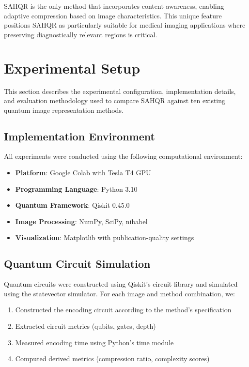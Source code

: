 \documentclass[pdflatex,sn-mathphys-num,Numbered]{sn-jnl}
\theoremstyle{thmstyleone}
\theoremstyle{thmstyletwo}
\theoremstyle{thmstylethree}
\begin{document}
SAHQR is the only method that incorporates content-awareness, enabling adaptive compression based on image characteristics. This unique feature positions SAHQR as particularly suitable for medical imaging applications where preserving diagnostically relevant regions is critical.

\section{Experimental Setup}\label{sec:experiments}

This section describes the experimental configuration, implementation details, and evaluation methodology used to compare SAHQR against ten existing quantum image representation methods.

\subsection{Implementation Environment}

All experiments were conducted using the following computational environment:

\begin{itemize}
\item \textbf{Platform}: Google Colab with Tesla T4 GPU
\item \textbf{Programming Language}: Python 3.10
\item \textbf{Quantum Framework}: Qiskit 0.45.0 \cite{bib70}
\item \textbf{Image Processing}: NumPy, SciPy, nibabel
\item \textbf{Visualization}: Matplotlib with publication-quality settings \cite{bib71}
\end{itemize}

\subsection{Quantum Circuit Simulation}

Quantum circuits were constructed using Qiskit's circuit library and simulated using the statevector simulator. For each image and method combination, we:

\begin{enumerate}
\item Constructed the encoding circuit according to the method's specification
\item Extracted circuit metrics (qubits, gates, depth)
\item Measured encoding time using Python's time module
\item Computed derived metrics (compression ratio, complexity scores) \cite{bib72,bib73}
\end{enumerate}
\end{document}

